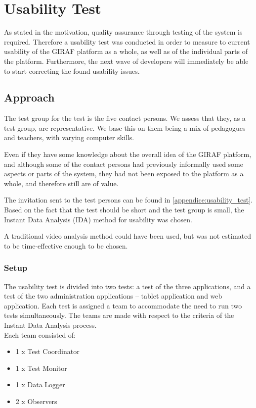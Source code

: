 \section{Usability Test}
\label{common:sec:usability_test}
As stated in the motivation, quality assurance through testing of the system is required. Therefore a usability test was conducted in order to measure to current usability of the GIRAF platform as a whole, as well as of the individual parts of the platform. Furthermore, the next wave of developers will immediately be able to start correcting the found usability issues.

\subsection{Approach}
The test group for the test is the five contact persons. We assess that they, as a test group, are representative. We base this on them being a mix of pedagogues and teachers, with varying computer skills.

Even if they have some knowledge about the overall idea of the GIRAF platform, and although some of the contact persons had previously informally used some aspects or parts of the system, they had not been exposed to the platform as a whole, and therefore still are of value.

The invitation sent to the test persons can be found in \autoref{appendice:usability_test}.\\

Based on the fact that the test should be short and the test group is small, the Instant Data Analysis (IDA) method for usability was chosen. \cite{usability:ida}

A traditional video analysis method could have been used, but was not estimated to be time-effective enough to be chosen.

\subsubsection*{Setup}
The usability test is divided into two tests: a test of the three applications, and a test of the two administration applications -- tablet application and web application.
Each test is assigned a team to accommodate the need to run two tests simultaneously.
The teams are made with respect to the criteria of the Instant Data Analysis process.\\
Each team consisted of:

\begin{itemize}
	\item 1 x Test Coordinator
	\item 1 x Test Monitor
	\item 1 x Data Logger
	\item 2 x Observers
\end{itemize}

